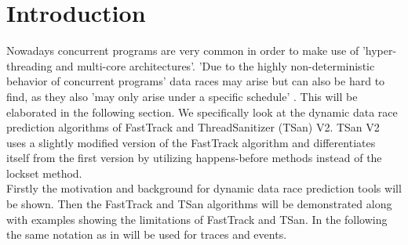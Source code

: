\documentclass[12pt]{article}
\begin{document}
	\section{Introduction}
	Nowadays concurrent programs are very common in order to make use of 'hyper-threading and multi-core architectures'\cite[p. 14]{SWB-1830643851}. 'Due to the highly non-deterministic behavior of concurrent programs' \cite[p. 1]{sulzmann} data races may arise but can also be hard to find, as they also 'may only arise under a specific schedule' \cite[p. 1]{sulzmann}. This will be elaborated in the following section. We specifically look at the dynamic data race prediction algorithms of FastTrack and ThreadSanitizer (TSan) V2. TSan V2 uses a slightly modified version of the FastTrack algorithm and differentiates itself from the first version by utilizing happens-before methods instead of the lockset method.\\
	Firstly the motivation and background for dynamic data race prediction tools will be shown. Then the FastTrack and TSan algorithms will be demonstrated along with examples showing the limitations of FastTrack and TSan. In the following the same notation as in \cite{sulzmann} will be used for traces and events.
\end{document}
